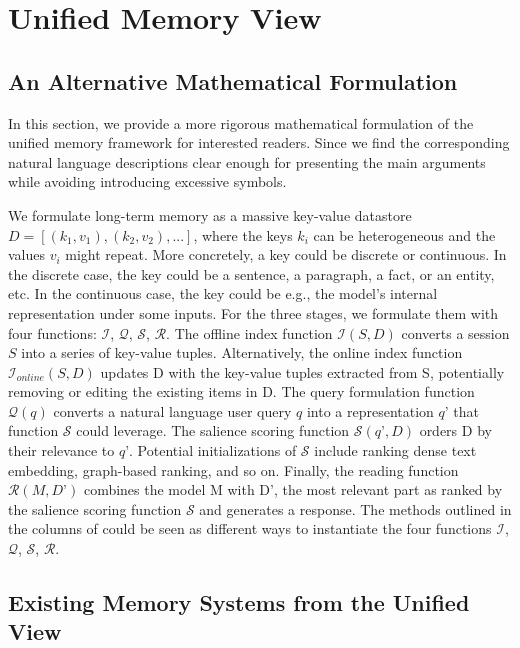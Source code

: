 \section{Unified Memory View}
\label{appendix-mem-system-view}

\subsection{An Alternative Mathematical Formulation}

In this section, we provide a more rigorous mathematical formulation of the unified memory framework for interested readers. Since we find the corresponding natural language descriptions clear enough for presenting the main arguments while avoiding introducing excessive symbols.

We formulate long-term memory as a massive key-value datastore $D = [(k_1, v_1), (k_2, v_2), ...]$, where the keys $k_i$ can be heterogeneous and the values $v_i$ might repeat. More concretely, a key could be discrete or continuous. In the discrete case, the key could be a sentence, a paragraph, a fact, or an entity, etc. In the continuous case, the key could be e.g., the model’s internal representation under some inputs. For the three stages, we formulate them with four functions: $\mathcal{I}$, $\mathcal{Q}$, $\mathcal{S}$, $\mathcal{R}$. The offline index function $\mathcal{I}(S, D)$ converts a session $S$ into a series of key-value tuples. Alternatively, the online index function $\mathcal{I}_{online}(S, D)$ updates D with the key-value tuples extracted from S, potentially removing or editing the existing items in D. The query formulation function $\mathcal{Q}(q)$ converts a natural language user query $q$ into a representation $q’$ that function $\mathcal{S}$ could leverage. The salience scoring function $\mathcal{S}(q’, D)$ orders D by their relevance to $q’$. Potential initializations of $\mathcal{S}$ include ranking dense text embedding, graph-based ranking, and so on. Finally, the reading function $\mathcal{R}(M, D’)$ combines the model M with D’, the most relevant part as ranked by the salience scoring function $\mathcal{S}$ and generates a response. The methods outlined in the columns of  could be seen as different ways to instantiate the four functions $\mathcal{I}$, $\mathcal{Q}$, $\mathcal{S}$, $\mathcal{R}$.


\subsection{Existing Memory Systems from the Unified View}

